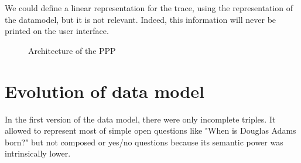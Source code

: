 We could define a linear representation for the trace, using the representation of the datamodel, but it is not relevant. Indeed, this information will never be printed on the user interface.

\begin{figure}[!ht]
    \centering
    \label{datamodel:struct}
    
    \caption{Architecture of the PPP}
\end{figure}

\section{Evolution of data model}

In the first version of the data model, there were only incomplete triples. It allowed to represent most of simple open questions like "When is Douglas Adams born?" but not composed or yes/no questions because its semantic power was intrinsically lower.
